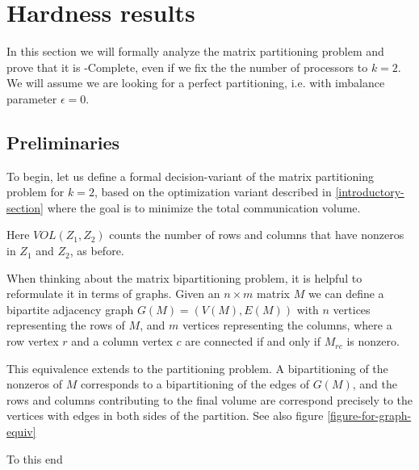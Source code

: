 \documentclass{article}
\newcommand{\mbpt}{\textsc{Matrix Bipartition}}
\begin{document}
	\section{Hardness results}
	In this section we will formally analyze the matrix partitioning
	problem and prove that it is \NP-Complete, even if we fix the
	the number of processors to $k = 2$. We will assume we are looking
	for a perfect partitioning, i.e. with imbalance parameter $\epsilon = 0$.

	\subsection{Preliminaries}
	To begin, let us define a formal decision-variant of the matrix
	partitioning problem for $k = 2$, based on the optimization
	variant described in \ref{introductory-section} where the goal
	is to minimize the total communication volume.

	\begin{problem}
		\problemtitle{\mbpt}
	\end{problem}

	Here $VOL(Z_1, Z_2)$ counts the number of rows and columns that
	have nonzeros in $Z_1$ and $Z_2$, as before.

	When thinking about the matrix bipartitioning problem, it is helpful
	to reformulate it in terms of graphs. Given an $n \times m$ matrix $M$
	we can define a bipartite adjacency graph $G(M) = (V(M), E(M))$ with
	$n$ vertices representing the rows of $M$, and $m$ vertices representing
	the columns, where a row vertex $r$ and a column vertex $c$ are connected
	if and only if $M_{rc}$ is nonzero.

	This equivalence extends to the partitioning problem. A bipartitioning of
	the nonzeros of $M$ corresponds to a bipartitioning of the edges of $G(M)$,
	and the rows and columns contributing to the final volume are correspond
	precisely to the vertices with edges in both sides of the partition. See
	also figure \ref{figure-for-graph-equiv}

	To this end 

		
\end{document}
